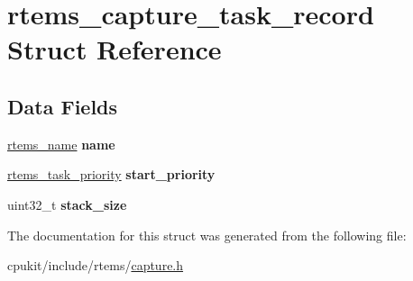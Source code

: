 \hypertarget{structrtems__capture__task__record}{}\section{rtems\+\_\+capture\+\_\+task\+\_\+record Struct Reference}
\label{structrtems__capture__task__record}
\subsection*{Data Fields}
\begin{DoxyCompactItemize}
\item 
\mbox{\label{structrtems__capture__task__record_ad8cd06565f042b862645fcb8b0c6cead}} 
\mbox{\hyperlink{group__ClassicTasks_ga55fb63c49f68c0cbd9bee004da15b1fd}{rtems\+\_\+name}} {\bfseries name}
\item 
\mbox{\label{structrtems__capture__task__record_aff11e9d943c499fefc6f00775a23a3c0}} 
\mbox{\hyperlink{group__ClassicTasks_gaa80a0c0938307d1e99d0eb5fee765b47}{rtems\+\_\+task\+\_\+priority}} {\bfseries start\+\_\+priority}
\item 
\mbox{\label{structrtems__capture__task__record_ad17b493c437e1fa337a6131becbdf16d}} 
uint32\+\_\+t {\bfseries stack\+\_\+size}
\end{DoxyCompactItemize}


The documentation for this struct was generated from the following file\+:\begin{DoxyCompactItemize}
\item 
cpukit/include/rtems/\mbox{\hyperlink{capture_8h}{capture.\+h}}\end{DoxyCompactItemize}

